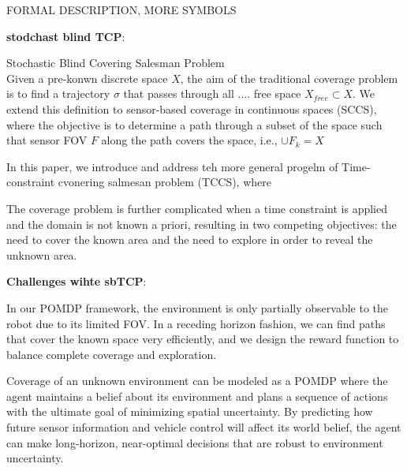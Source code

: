 \documentclass{article}
\newcommand{\ph}[1]{{\textbf{#1}:}} %
\begin{document}
FORMAL DESCRIPTION, MORE SYMBOLS


\ph{stodchast blind TCP} 

Stochastic Blind Covering Salesman Problem \\

Given a pre-konwn discrete space $X$, the aim of the traditional coverage problem is to find a trajectory $\sigma$ that passes through all ....  free space $X_{free}\subset X$. 
We extend this definition to sensor-based coverage in 
continuous spaces (SCCS), where the objective is to determine a path through a subset of the space such that sensor FOV $F$ along the path covers the space, i.e., $\cup F_k = X$ %

In this paper, we introduce and address teh  more general progelm of 
Time-constraint cvonering salmesan problem (TCCS), where 

The coverage problem is further complicated when a time constraint is applied and the domain is not known a priori, resulting in two competing objectives: the need to cover the known area and the need to explore in order to reveal the unknown area. %

\ph{Challenges wihte sbTCP} 

In our POMDP framework, the environment is only partially observable to the robot due to its limited FOV. In a receding horizon fashion, we can find paths that cover the known space very efficiently, and we design the reward function to balance complete coverage and exploration.

Coverage of an unknown environment can be modeled as a POMDP where the agent maintains a belief about its environment and plans a sequence of actions with the ultimate goal of minimizing spatial uncertainty. By predicting how future sensor information and vehicle control will affect its world belief, the agent can make long-horizon, near-optimal decisions that are robust to environment uncertainty. 
\end{document}
